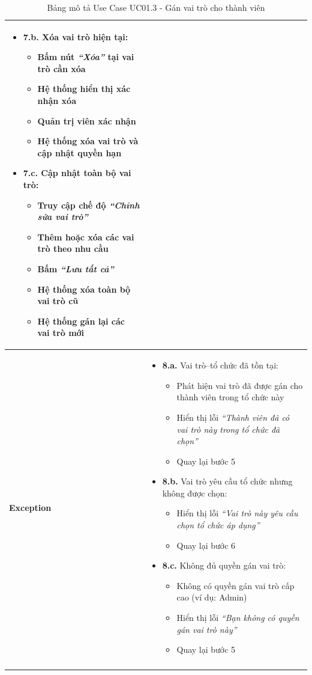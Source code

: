 \begin{longtable}{|m{}|m{}|}
\begin{itemize}[label=--]
    \item \textbf{7.b.} Xóa vai trò hiện tại:
    \begin{itemize}[label=+]
        \item Bấm nút \textit{``Xóa''} tại vai trò cần xóa
        \item Hệ thống hiển thị xác nhận xóa
        \item Quản trị viên xác nhận
        \item Hệ thống xóa vai trò và cập nhật quyền hạn
    \end{itemize}

    \item \textbf{7.c.} Cập nhật toàn bộ vai trò:
    \begin{itemize}[label=+]
        \item Truy cập chế độ \textit{``Chỉnh sửa vai trò''}
        \item Thêm hoặc xóa các vai trò theo nhu cầu
        \item Bấm \textit{``Lưu tất cả''}
        \item Hệ thống xóa toàn bộ vai trò cũ
        \item Hệ thống gán lại các vai trò mới
    \end{itemize}
\end{itemize}
\\ 
\hline

\textbf{Exception} 
&
\begin{itemize}[label=--]
    \item \textbf{8.a.} Vai trò--tổ chức đã tồn tại:
    \begin{itemize}[label=+]
        \item Phát hiện vai trò đã được gán cho thành viên trong tổ chức này
        \item Hiển thị lỗi \textit{``Thành viên đã có vai trò này trong tổ chức đã chọn''}
        \item Quay lại bước 5
    \end{itemize}

    \item \textbf{8.b.} Vai trò yêu cầu tổ chức nhưng không được chọn:
    \begin{itemize}[label=+]
        \item Hiển thị lỗi \textit{``Vai trò này yêu cầu chọn tổ chức áp dụng''}
        \item Quay lại bước 6
    \end{itemize}

    \item \textbf{8.c.} Không đủ quyền gán vai trò:
    \begin{itemize}[label=+]
        \item Không có quyền gán vai trò cấp cao (ví dụ: Admin)
        \item Hiển thị lỗi \textit{``Bạn không có quyền gán vai trò này''}
        \item Quay lại bước 5
    \end{itemize}
\end{itemize}
\\ \hline
\caption{Bảng mô tả Use Case UC01.3 - Gán vai trò cho thành viên}
\end{longtable}

